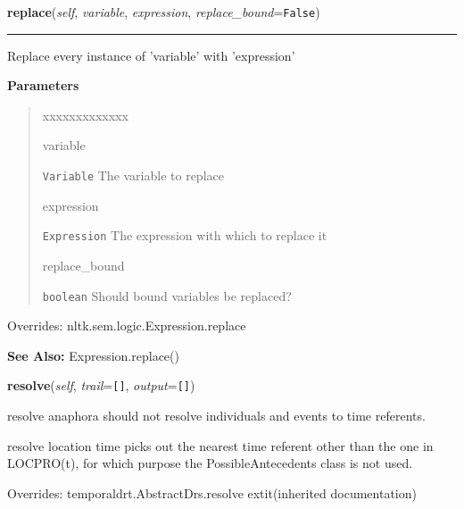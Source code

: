 \hspace{.8\funcindent}\begin{boxedminipage}{\funcwidth}

    \raggedright \textbf{replace}(\textit{self}, \textit{variable}, \textit{expression}, \textit{replace\_bound}={\tt False})

    \vspace{-1.5ex}

    \rule{\textwidth}{0.5\fboxrule}
\setlength{\parskip}{2ex}
    Replace every instance of 'variable' with 'expression'

\setlength{\parskip}{1ex}
      \textbf{Parameters}
      \vspace{-1ex}

      \begin{quote}
        \begin{Ventry}{xxxxxxxxxxxxx}

          \item[variable]

          \texttt{Variable} The variable to replace

          \item[expression]

          \texttt{Expression} The expression with which to replace it

          \item[replace\_bound]

          \texttt{boolean} Should bound variables be replaced?

        \end{Ventry}

      \end{quote}

      Overrides: nltk.sem.logic.Expression.replace

\textbf{See Also:} Expression.replace()



    \end{boxedminipage}

    \vspace{0.5ex}

\hspace{.8\funcindent}\begin{boxedminipage}{\funcwidth}

    \raggedright \textbf{resolve}(\textit{self}, \textit{trail}={\tt \texttt{[}\texttt{]}}, \textit{output}={\tt \texttt{[}\texttt{]}})

\setlength{\parskip}{2ex}
    resolve anaphora should not resolve individuals and events to time 
    referents.

    resolve location time picks out the nearest time referent other than 
    the one in LOCPRO(t), for which purpose the PossibleAntecedents class 
    is not used.

\setlength{\parskip}{1ex}
      Overrides: temporaldrt.AbstractDrs.resolve 	extit{(inherited documentation)}

    \end{boxedminipage}


